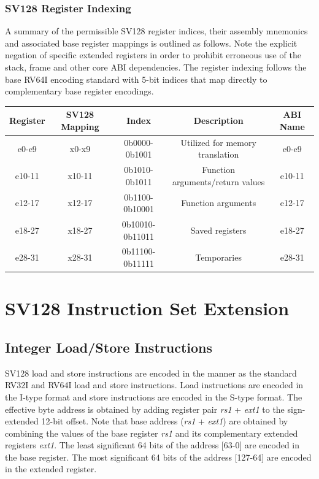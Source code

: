 \documentclass{article}
\begin{document}
\newpage
\subsubsection{SV128 Register Indexing}
A summary of the permissible SV128 register indices, their assembly 
mnemonics and associated base register mappings is outlined as follows.  
Note the explicit negation of specific extended registers in order to prohibit 
erroneous use of the stack, frame and other core ABI dependencies.  The register 
indexing follows the base RV64I encoding standard with 5-bit indices that 
map directly to complementary base register encodings.  

\begin{center}
\begin{tabular}{| c | c | c | c | c |}
\hline
Register & SV128 Mapping & Index & Description & ABI Name\\ \hline
\hline
e0-e9 & x0-x9 & 0b0000-0b1001 & Utilized for memory translation & e0-e9\\
\hline
e10-11 & x10-11 & 0b1010-0b1011 & Function arguments/return values & e10-11\\
\hline
e12-17 & x12-17 & 0b1100-0b10001 & Function arguments & e12-17\\
\hline
e18-27 & x18-27 & 0b10010-0b11011 & Saved registers & e18-27\\
\hline
e28-31 & x28-31 & 0b11100-0b11111 & Temporaries & e28-31\\
\hline
\end{tabular}
\end{center}

\clearpage
\section{SV128 Instruction Set Extension}
\label{sec:SV128InstructionSetExtension}

\subsection{Integer Load/Store Instructions}

SV128 load and store instructions are encoded in the manner as the standard RV32I and 
RV64I load and store instructions.  Load instructions are encoded in the I-type format and store 
instructions are encoded in the S-type format.  The effective byte address is obtained by adding 
register pair \textit{rs1} + \textit{ext1} to the sign-extended 12-bit offset.  Note that base address 
(\textit{rs1} + \textit{ext1}) are obtained by combining the values of the base register \textit{rs1} 
and its complementary extended registers \textit{ext1}.  The least significant 64 bits of the address
[63-0] are encoded in the base register.  The most significant 64 bits of the address [127-64] 
are encoded in the extended register.  
\end{document}
